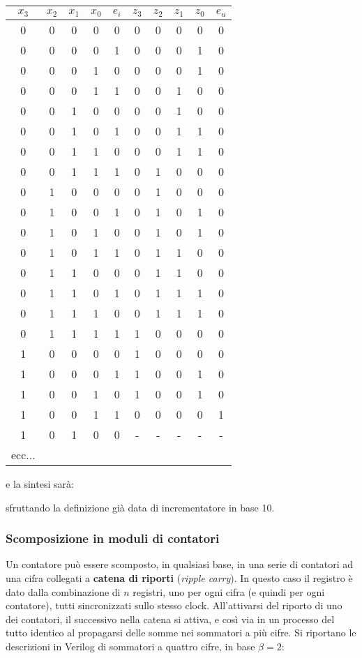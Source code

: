 \documentclass[a4paper,11pt]{article}
\begin{document}
\begin{table}[H]
	\center 
	\begin{tabular} { c c  c  c  c | c  c  c  c  c }
		$x_3$ & $x_2$ & $x_1$ & $x_0$ & $e_i$ & $z_3$ & $z_2$ & $z_1$ & $z_0$ & $e_u$ \\ 
		\hline
		0 & 0 & 0 & 0 & 0 & 0 & 0 & 0 & 0 & 0 \\
		0 & 0 & 0 & 0 & 1 & 0 & 0 & 0 & 1 & 0 \\
		0 & 0 & 0 & 1 & 0 & 0 & 0 & 0 & 1 & 0 \\
		0 & 0 & 0 & 1 & 1 & 0 & 0 & 1 & 0 & 0 \\
		0 & 0 & 1 & 0 & 0 & 0 & 0 & 1 & 0 & 0 \\
		0 & 0 & 1 & 0 & 1 & 0 & 0 & 1 & 1 & 0 \\
		0 & 0 & 1 & 1 & 0 & 0 & 0 & 1 & 1 & 0 \\
		0 & 0 & 1 & 1 & 1 & 0 & 1 & 0 & 0 & 0 \\
		0 & 1 & 0 & 0 & 0 & 0 & 1 & 0 & 0 & 0 \\
		0 & 1 & 0 & 0 & 1 & 0 & 1 & 0 & 1 & 0 \\
		0 & 1 & 0 & 1 & 0 & 0 & 1 & 0 & 1 & 0 \\
		0 & 1 & 0 & 1 & 1 & 0 & 1 & 1 & 0 & 0 \\
		0 & 1 & 1 & 0 & 0 & 0 & 1 & 1 & 0 & 0 \\
		0 & 1 & 1 & 0 & 1 & 0 & 1 & 1 & 1 & 0 \\
		0 & 1 & 1 & 1 & 0 & 0 & 1 & 1 & 1 & 0 \\
		0 & 1 & 1 & 1 & 1 & 1 & 0 & 0 & 0 & 0 \\
		1 & 0 & 0 & 0 & 0 & 1 & 0 & 0 & 0 & 0 \\
		1 & 0 & 0 & 0 & 1 & 1 & 0 & 0 & 1 & 0 \\
		1 & 0 & 0 & 1 & 0 & 1 & 0 & 0 & 1 & 0 \\
		1 & 0 & 0 & 1 & 1 & 0 & 0 & 0 & 0 & 1 \\
		1 & 0 & 1 & 0 & 0 & - & - & - & - & - \\
		ecc...
	\end{tabular}
\end{table}

e la sintesi sarà:

sfruttando la definizione già data di incrementatore in base 10.

\subsubsection{Scomposizione in moduli di contatori}
Un contatore può essere scomposto, in qualsiasi base, in una serie di contatori ad una cifra collegati a \textbf{catena di riporti} (\textit{ripple carry}).
In questo caso il registro è dato dalla combinazione di $n$ registri, uno per ogni cifra (e quindi per ogni contatore), tutti sincronizzati sullo stesso clock.
All'attivarsi del riporto di uno dei contatori, il successivo nella catena si attiva, e così via in un processo del tutto identico al propagarsi delle somme nei sommatori a più cifre.
Si riportano le descrizioni in Verilog di sommatori a quattro cifre, in base $\beta = 2$:
\end{document}
